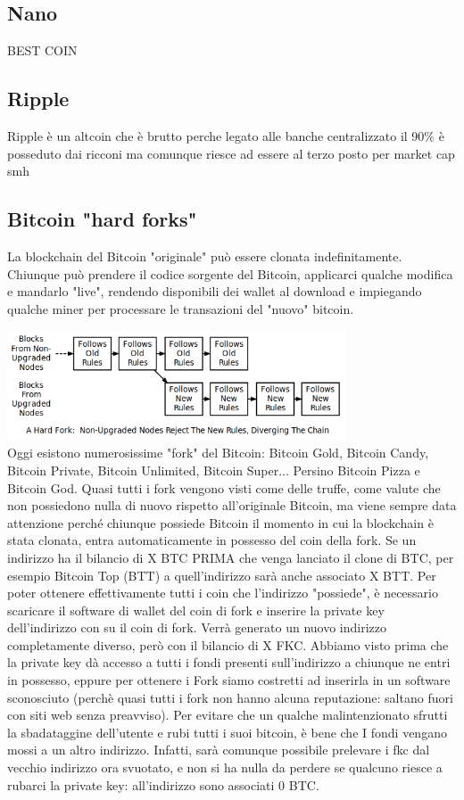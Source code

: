 \documentclass {article}
\begin{document}
{\subsection {Nano}


BEST COIN


\subsection {Ripple}


Ripple è un altcoin che è brutto perche legato alle banche centralizzato il 90\% è posseduto dai ricconi ma comunque riesce ad essere al terzo posto per market cap smh


\subsection {Bitcoin "hard forks"}


La blockchain del Bitcoin "originale" può essere clonata indefinitamente. Chiunque può prendere il codice sorgente del Bitcoin, applicarci qualche modifica e mandarlo "live", rendendo disponibili dei wallet al download e impiegando qualche miner per processare le transazioni del "nuovo" bitcoin.

\vspace {0.5cm}
\includegraphics [width = 10cm] {media/hard_fork.png}
\vspace {0.5cm}
\\
Oggi esistono numerosissime "fork" del Bitcoin: Bitcoin Gold, Bitcoin Candy, Bitcoin Private, Bitcoin Unlimited, Bitcoin Super... Persino Bitcoin Pizza e Bitcoin God.
Quasi tutti i fork vengono visti come delle truffe, come valute che non possiedono nulla di nuovo rispetto all'originale Bitcoin, ma viene sempre data attenzione perché chiunque possiede Bitcoin il momento in cui la blockchain è stata clonata, entra automaticamente in possesso del coin della fork.
Se un indirizzo ha il bilancio di X BTC PRIMA che venga lanciato il clone di BTC, per esempio Bitcoin Top (BTT) a quell'indirizzo sarà anche associato X BTT.
Per poter ottenere effettivamente tutti i coin che l'indirizzo "possiede", è necessario scaricare il software di wallet del coin di fork e inserire la private key dell'indirizzo con su il coin di fork.
Verrà generato un nuovo indirizzo completamente diverso, però con il bilancio di X FKC.
Abbiamo visto prima che la private key dà accesso a tutti i fondi presenti sull'indirizzo a chiunque ne entri in possesso, eppure per ottenere i Fork siamo costretti ad inserirla in un software sconosciuto (perchè quasi tutti i fork non hanno alcuna reputazione: saltano fuori con siti web senza preavviso).
Per evitare che un qualche malintenzionato sfrutti la sbadataggine dell'utente e rubi tutti i suoi bitcoin, è bene che I fondi vengano mossi a un altro indirizzo.
Infatti, sarà comunque possibile prelevare i fkc dal vecchio indirizzo ora svuotato, e non si ha nulla da perdere se qualcuno riesce a rubarci la private key: all'indirizzo sono associati 0 BTC.


}
\end{document}
